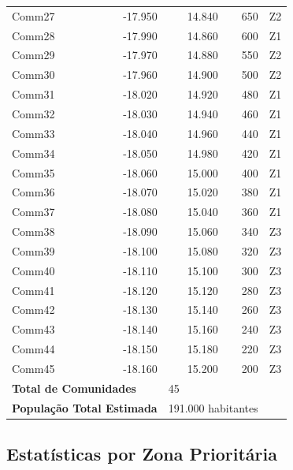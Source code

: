 \documentclass[12pt, a4paper]{article}
\begin{document}
\begin{table}[H]
{\begin{tabular}{lrrrr}
Comm27 & -17.950 & 14.840 & 650 & Z2 \\
Comm28 & -17.990 & 14.860 & 600 & Z1 \\
Comm29 & -17.970 & 14.880 & 550 & Z2 \\
Comm30 & -17.960 & 14.900 & 500 & Z2 \\
Comm31 & -18.020 & 14.920 & 480 & Z1 \\
Comm32 & -18.030 & 14.940 & 460 & Z1 \\
Comm33 & -18.040 & 14.960 & 440 & Z1 \\
Comm34 & -18.050 & 14.980 & 420 & Z1 \\
Comm35 & -18.060 & 15.000 & 400 & Z1 \\
Comm36 & -18.070 & 15.020 & 380 & Z1 \\
Comm37 & -18.080 & 15.040 & 360 & Z1 \\
Comm38 & -18.090 & 15.060 & 340 & Z3 \\
Comm39 & -18.100 & 15.080 & 320 & Z3 \\
Comm40 & -18.110 & 15.100 & 300 & Z3 \\
Comm41 & -18.120 & 15.120 & 280 & Z3 \\
Comm42 & -18.130 & 15.140 & 260 & Z3 \\
Comm43 & -18.140 & 15.160 & 240 & Z3 \\
Comm44 & -18.150 & 15.180 & 220 & Z3 \\
Comm45 & -18.160 & 15.200 & 200 & Z3 \\
\midrule
\multicolumn{2}{l}{\textbf{Total de Comunidades}} & \multicolumn{2}{l}{45} & \\
\multicolumn{2}{l}{\textbf{População Total Estimada}} & \multicolumn{2}{l}{191.000 habitantes} & \\
\bottomrule
\end{tabular}}
\end{table}

\subsection{Estatísticas por Zona Prioritária}
\end{document}
